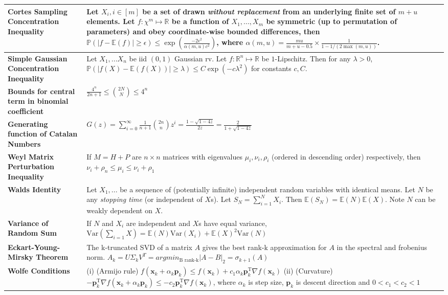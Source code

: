 \documentclass[11pt]{article}
\begin{document}
\begin{longtable}{|>{\raggedright}m{4.5cm}|m{13cm}|}
\textbf{Cortes Sampling Concentration Inequality} & Let $X_i, i \in [m]$ be a set of drawn \textit{without replacement} from an underlying finite set of $m+u$ elements. Let $f: \chi^m \mapsto \mathbb{R}$ be a function of $X_1,...,X_m$ be symmetric (up to permutation of parameters) and obey coordinate-wise bounded differences, then $\mathbb{P}(|f - \mathbb{E}(f)| \geq \epsilon) \leq \exp\left(  \frac{-2\epsilon^2}{\alpha(m,u)c^2} \right)$, where $\alpha(m,u)=\frac{mu}{m+u-0.5} \times \frac{1}{1-1/(2\max(m,u))}$.\\ \hline
\textbf{Simple Gaussian Concentration Inequality} & Let $X_1,...X_n$ be iid $(0,1)$ Gaussian rv. Let $f:\mathbb{R}^n \mapsto \mathbb{R}$ be $1$-Lipschitz. Then for any $\lambda >0$, $\mathbb{P}(|f(X) - \mathbb{E}(f(X))| \geq \lambda) \leq C\exp(-c\lambda^2)$ for constants $c, C$.\\ \hline
\textbf{Bounds for central term in binomial coefficient} & $\frac{4^n}{2n+1} \leq \binom{2N}{N} \leq 4^n$\\ \hline
\textbf{Generating function of Catalan Numbers} & $G(z) = \sum_{i=0}^{\infty} \frac{1}{n+1} \binom{2n}{n} z^i = \frac{1-\sqrt{1-4z}}{2z} = \frac{2}{1+\sqrt{1-4z}}$\\ \hline
\textbf{Weyl Matrix Perturbation Inequality} & If $M=H+P$ are $n \times n$ matrices with eigenvalues $\mu_i, \nu_i, \rho_i$ (ordered in descending order) respectively, then $\nu_i + \rho_n \leq \mu_i \leq \nu_i + \rho_1$\\ \hline
\textbf{Walds Identity} & Let $X_1,...$ be a sequence of (potentially infinite) independent random variables with identical means. Let $N$ be any \textit{stopping time} (or independent of $X$s). Let $S_N=\sum_{i=1}^{N}X_i$. Then $\mathbb{E}(S_N)=\mathbb{E}(N)\mathbb{E}(X)$. Note $N$ can be weakly dependent on $X$.\\ \hline
\textbf{Variance of Random Sum} & If $N$ and $X_i$ are independent and $X$s have equal variance, $\text{Var}(\sum_{i=1}{X}) = \mathbb{E}(N)\text{Var}(X_i) + \mathbb{E}(X)^2\text{Var}(N)$\\ \hline
\textbf{Eckart-Young-Mirsky Theorem} & The k-truncated SVD of a matrix $A$ gives the best rank-k approximation for $A$ in the spectral and frobenius norm. $A_k = U\Sigma_k V^T = argmin_{\text{B rank-k}}|A-B|_2 = \sigma_{k+1}(A)$\\ \hline
\textbf{Wolfe Conditions} & (i) (Armijo rule) $ f(\mathbf{x}_k+\alpha_k\mathbf{p}_k)\leq f(\mathbf{x}_k)+c_1\alpha_k\mathbf{p}_k^{\mathrm T}\nabla f(\mathbf{x}_k) $ (ii) (Curvature) $-\mathbf{p}_k^{\mathrm T}\nabla f(\mathbf{x}_k+\alpha_k\mathbf{p}_k) \leq -c_2\mathbf{p}_k^{\mathrm T}\nabla f(\mathbf{x}_k)$, where $\alpha_k$ is step size, $\mathbf{p}_k$ is descent direction and $ 0 < c_1 < c_2 < 1 $\\ \hline

\end{longtable}
\end{document}
